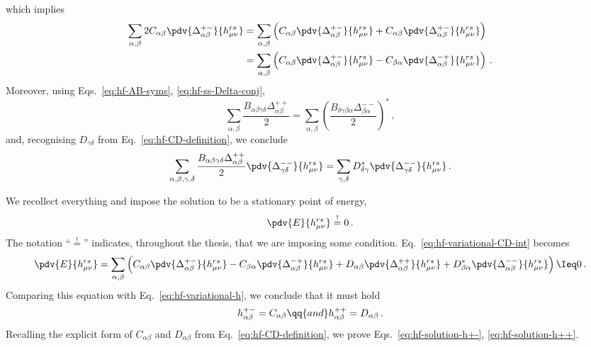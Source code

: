\begin{tabproof}
\[	\]
	which implies
	\[
	\begin{aligned}
		\sum_{\alpha,\beta} 2C_{\alpha\beta} \pdv{\Delta_{\alpha\beta}^{+-}}{h_{\mu\nu}^{rs}} &= \sum_{\alpha,\beta} \left( C_{\alpha\beta} \pdv{\Delta_{\alpha\beta}^{+-}}{h_{\mu\nu}^{rs}} + C_{\alpha\beta} \pdv{\Delta_{\alpha\beta}^{+-}}{h_{\mu\nu}^{rs}} \right) \\
		&= \sum_{\alpha,\beta} \left( C_{\alpha\beta} \pdv{\Delta_{\alpha\beta}^{+-}}{h_{\mu\nu}^{rs}} - C_{\beta\alpha} \pdv{\Delta_{\alpha\beta}^{-+}}{h_{\mu\nu}^{rs}} \right) \, .
	\end{aligned}
	\]
	Moreover, using Eqs.~\eqref{eq:hf-AB-syms}, \eqref{eq:hf-ss-Delta-conj},
	\[
		\sum_{\alpha,\beta} \frac{B_{\alpha\beta\gamma\delta} \Delta_{\alpha\beta}^{++}}{2}
		= \sum_{\alpha,\beta} \left(
			\frac{B_{\delta\gamma\beta\alpha} \Delta_{\beta\alpha}^{--}}{2}
		\right)^* \, ,
	\]
	and, recognising $D_{\gamma\delta}$ from Eq.~\eqref{eq:hf-CD-definition}, we conclude
	\[
		\sum_{\alpha,\beta,\gamma,\delta} \frac{B_{\alpha\beta\gamma\delta} \Delta_{\alpha\beta}^{++}}{2} \pdv{\Delta_{\gamma\delta}^{--}}{h_{\mu\nu}^{rs}}
		= \sum_{\gamma,\delta}
		D_{\delta\gamma}^*
		\pdv{\Delta_{\gamma\delta}^{--}}{h_{\mu\nu}^{rs}} \, .
	\]
	
	We recollect everything and impose the solution to be a stationary point of energy,
	\[
		\pdv{E}{h_{\mu\nu}^{rs}} \stackrel{!}{=} 0 \, .
	\]
	The notation ``$\stackrel{!}{=}$'' indicates, throughout the thesis, that we are imposing some condition. Eq.~\eqref{eq:hf-variational-CD-int} becomes
	\begin{equation}\label{eq:hf-variational-CD}
		\pdv{E}{h_{\mu\nu}^{rs}} = \sum_{\alpha,\beta} \left( 
			C_{\alpha\beta} \pdv{\Delta_{\alpha\beta}^{+-}}{h_{\mu\nu}^{rs}} - C_{\beta\alpha} \pdv{\Delta_{\alpha\beta}^{-+}}{h_{\mu\nu}^{rs}} + D_{\alpha\beta} \pdv{\Delta_{\alpha\beta}^{++}}{h_{\mu\nu}^{rs}} + D_{\beta\alpha}^* 	\pdv{\Delta_{\alpha\beta}^{--}}{h_{\mu\nu}^{rs}}
		\right) \Ieq 0 \, .
	\end{equation}
	Comparing this equation with Eq.~\eqref{eq:hf-variational-h}, we conclude that it must hold
	\[
		h_{\alpha\beta}^{+-} = C_{\alpha\beta}
		\qq{and}
		h_{\alpha\beta}^{++} = D_{\alpha\beta} \, .
	\]
	Recalling the explicit form of $C_{\alpha\beta}$ and $D_{\alpha\beta}$ from  Eq.~\eqref{eq:hf-CD-definition}, we prove Eqs.~\eqref{eq:hf-solution-h+-}, \eqref{eq:hf-solution-h++}.
\end{tabproof}

